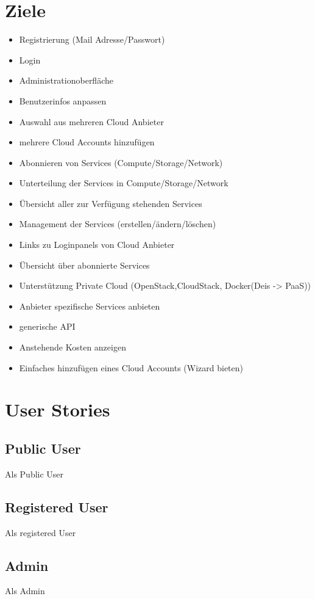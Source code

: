 \documentclass[11pt]{scrartcl}
\begin{document}
\section{Ziele}
\begin{itemize}
  \item Registrierung (Mail Adresse/Passwort)
  \item Login
  \item Administrationoberfläche
  \item Benutzerinfos anpassen
  \item Auswahl aus mehreren Cloud Anbieter
  \item mehrere Cloud Accounts hinzufügen
  \item Abonnieren von Services (Compute/Storage/Network)
  \item Unterteilung der Services in Compute/Storage/Network
  \item Übersicht aller zur Verfügung stehenden Services
  \item Management der Services (erstellen/ändern/löschen)
  \item Links zu Loginpanels von Cloud Anbieter
  \item Übersicht über abonnierte Services
  \item Unterstützung Private Cloud (OpenStack,CloudStack, Docker(Deis -> PaaS))
  \item Anbieter spezifische Services anbieten
  \item generische API
  \item Anstehende Kosten anzeigen
  \item Einfaches hinzufügen eines Cloud Accounts (Wizard bieten)
\end{itemize}



\section{User Stories}

\subsection{Public User}
Als Public User
\subsection{Registered User}
Als registered User
\subsection{Admin}
Als Admin
\end{document}
